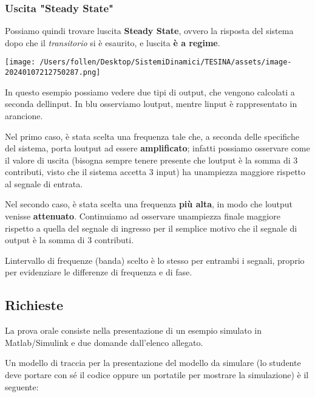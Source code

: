 \documentclass[
]{article}
\begin{document}
\hypertarget{uscita-steady-state}{%
\subsubsection{Uscita "Steady State"}\label{uscita-steady-state}}

Possiamo quindi trovare l\textquotesingle uscita \textbf{Steady State},
ovvero la risposta del sistema dopo che il \emph{transitorio} si è
esaurito, e l\textquotesingle uscita \textbf{è a regime}.

\texttt{[image: /Users/follen/Desktop/SistemiDinamici/TESINA/assets/image-20240107212750287.png]}

In questo esempio possiamo vedere due tipi di output, che vengono
calcolati a seconda dell\textquotesingle input. In blu osserviamo
l\textquotesingle output, mentre l\textquotesingle input è rappresentato
in arancione.

Nel primo caso, è stata scelta una frequenza tale che, a seconda delle
specifiche del sistema, porta l\textquotesingle output ad essere
\textbf{amplificato}; infatti possiamo osservare come il valore di
uscita (bisogna sempre tenere presente che l\textquotesingle output è la
somma di 3 contributi, visto che il sistema accetta 3 input) ha
un\textquotesingle ampiezza maggiore rispetto al segnale di entrata.

Nel secondo caso, è stata scelta una frequenza \textbf{più alta}, in
modo che l\textquotesingle output venisse \textbf{attenuato}.
Continuiamo ad osservare un\textquotesingle ampiezza finale maggiore
rispetto a quella del segnale di ingresso per il semplice motivo che il
segnale di output è la somma di 3 contributi.

L\textquotesingle intervallo di frequenze (banda) scelto è lo stesso per
entrambi i segnali, proprio per evidenziare le differenze di frequenza e
di fase.

\hypertarget{richieste}{%
\subsection{Richieste}\label{richieste}}

La prova orale consiste nella presentazione di un esempio simulato in
Matlab/Simulink e due domande dall'elenco allegato.

Un modello di traccia per la presentazione del modello da simulare (lo
studente deve portare con sé il codice oppure un portatile per mostrare
la simulazione) è il seguente:
\end{document}
